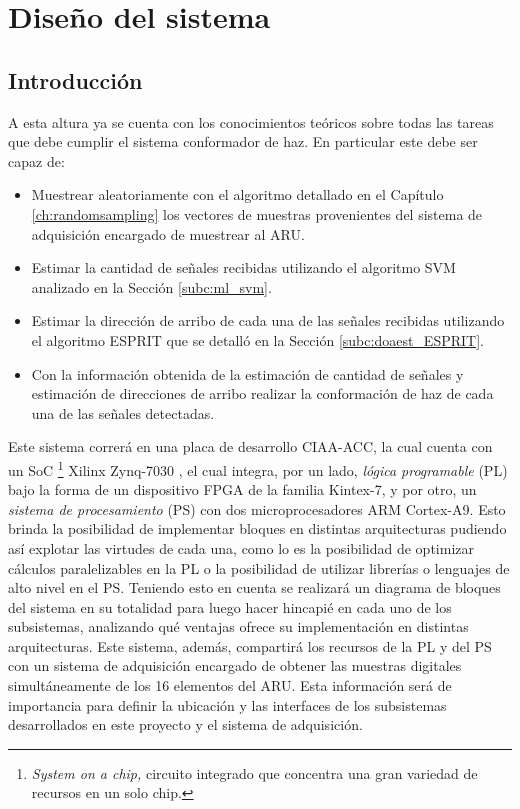 \chapter{Diseño del sistema}\label{ch:sistema}

\section{Introducción}\label{subc:sistema_intro}
A esta altura ya se cuenta con los conocimientos teóricos sobre todas las tareas que debe cumplir el sistema conformador de haz. En particular este debe ser capaz de:
\begin{itemize}
    \item Muestrear aleatoriamente con el algoritmo detallado en el Capítulo \ref{ch:randomsampling} los vectores de muestras provenientes del sistema de adquisición encargado de muestrear al ARU.
    \item Estimar la cantidad de señales recibidas utilizando el algoritmo SVM analizado en la Sección \ref{subc:ml_svm}.
    \item Estimar la dirección de arribo de cada una de las señales recibidas utilizando el algoritmo ESPRIT que se detalló en la Sección \ref{subc:doaest_ESPRIT}.
    \item Con la información obtenida de la estimación de cantidad de señales y estimación de direcciones de arribo realizar la conformación de haz de cada una de las señales detectadas.
\end{itemize}

Este sistema correrá en una placa de desarrollo CIAA-ACC, la cual cuenta con un SoC \footnote{\emph{System on a chip,} circuito integrado que concentra una gran variedad de recursos en un solo chip.} Xilinx Zynq-7030 \cite{bib:zynq}, el cual integra, por un lado, \emph{lógica programable} (PL) bajo la forma de un dispositivo FPGA de la familia Kintex-7, y por otro, un \emph{sistema de procesamiento} (PS) con dos microprocesadores ARM Cortex-A9. Esto brinda la posibilidad de implementar bloques en distintas arquitecturas pudiendo así explotar las virtudes de cada una, como lo es la posibilidad de optimizar cálculos paralelizables en la PL o la posibilidad de utilizar librerías o lenguajes de alto nivel en el PS. Teniendo esto en cuenta se realizará un diagrama de bloques del sistema en su totalidad para luego hacer hincapié en cada uno de los subsistemas, analizando qué ventajas ofrece su implementación en distintas arquitecturas. Este sistema, además, compartirá los recursos de la PL y del PS con un sistema de adquisición encargado de obtener las muestras digitales simultáneamente de los 16 elementos del ARU. Esta información será de importancia para definir la ubicación y las interfaces de los subsistemas desarrollados en este proyecto y el sistema de adquisición.

